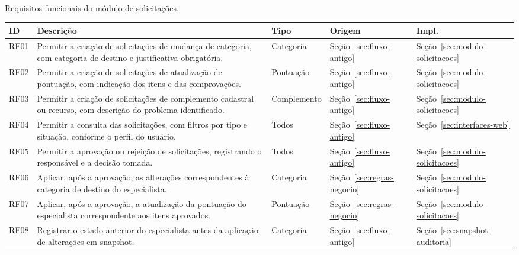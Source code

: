 \FloatBarrier
\begin{quadro}[htbp]
\centering
\caption[Requisitos funcionais do módulo]{Requisitos funcionais do módulo de solicitações.}
\label{qua:rf}
\small
\setlength{\tabcolsep}{3pt}
\renewcommand{\arraystretch}{1.2}
\begin{tabularx}{\linewidth}{
    >{\raggedright\arraybackslash}p{1cm}
    >{\raggedright\arraybackslash}X
    >{\raggedright\arraybackslash}p{2.2cm}
    >{\raggedright\arraybackslash}p{2.2cm}
    >{\raggedright\arraybackslash}p{2.1cm}
}
\toprule
\textbf{ID} & \textbf{Descrição} & \textbf{Tipo} & \textbf{Origem} & \textbf{Impl.} \\
\midrule
RF01 & Permitir a criação de solicitações de mudança de categoria, com categoria de destino e justificativa obrigatória. & Categoria & Seção~\ref{sec:fluxo-antigo} & Seção~\ref{sec:modulo-solicitacoes} \\
\midrule
RF02 & Permitir a criação de solicitações de atualização de pontuação, com indicação dos itens e das comprovações. & Pontuação & Seção~\ref{sec:fluxo-antigo} & Seção~\ref{sec:modulo-solicitacoes} \\
\midrule
RF03 & Permitir a criação de solicitações de complemento cadastral ou recurso, com descrição do problema identificado. & Complemento & Seção~\ref{sec:fluxo-antigo} & Seção~\ref{sec:modulo-solicitacoes} \\
\midrule
RF04 & Permitir a consulta das solicitações, com filtros por tipo e situação, conforme o perfil do usuário. & Todos & Seção~\ref{sec:fluxo-antigo} & Seção~\ref{sec:interfaces-web} \\
\midrule
RF05 & Permitir a aprovação ou rejeição de solicitações, registrando o responsável e a decisão tomada. & Todos & Seção~\ref{sec:fluxo-antigo} & Seção~\ref{sec:modulo-solicitacoes} \\
\midrule
RF06 & Aplicar, após a aprovação, as alterações correspondentes à categoria de destino do especialista. & Categoria & Seção~\ref{sec:regras-negocio} & Seção~\ref{sec:modulo-solicitacoes} \\
\midrule
RF07 & Aplicar, após a aprovação, a atualização da pontuação do especialista correspondente aos itens aprovados. & Pontuação & Seção~\ref{sec:regras-negocio} & Seção~\ref{sec:modulo-solicitacoes} \\
\midrule
RF08 & Registrar o estado anterior do especialista antes da aplicação de alterações em snapshot. & Categoria & Seção~\ref{sec:fluxo-antigo} & Seção~\ref{sec:snapshot-auditoria} \\

\end{tabularx}
\end{quadro}
